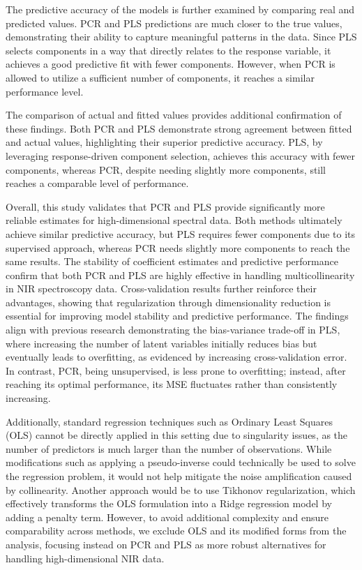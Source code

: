 \documentclass[11pt,twoside,a4paper]{article}
\begin{document}
The predictive accuracy of the models is further examined by comparing real and predicted values. PCR and PLS predictions are much closer to the true values, demonstrating their ability to capture meaningful patterns in the data. Since PLS selects components in a way that directly relates to the response variable, it achieves a good predictive fit with fewer components. However, when PCR is allowed to utilize a sufficient number of components, it reaches a similar performance level.

The comparison of actual and fitted values provides additional confirmation of these findings. Both PCR and PLS demonstrate strong agreement between fitted and actual values, highlighting their superior predictive accuracy. PLS, by leveraging response-driven component selection, achieves this accuracy with fewer components, whereas PCR, despite needing slightly more components, still reaches a comparable level of performance.

Overall, this study validates that PCR and PLS provide significantly more reliable estimates for high-dimensional spectral data. Both methods ultimately achieve similar predictive accuracy, but PLS requires fewer components due to its supervised approach, whereas PCR needs slightly more components to reach the same results. The stability of coefficient estimates and predictive performance confirm that both PCR and PLS are highly effective in handling multicollinearity in NIR spectroscopy data. Cross-validation results further reinforce their advantages, showing that regularization through dimensionality reduction is essential for improving model stability and predictive performance. The findings align with previous research demonstrating the bias-variance trade-off in PLS, where increasing the number of latent variables initially reduces bias but eventually leads to overfitting, as evidenced by increasing cross-validation error. In contrast, PCR, being unsupervised, is less prone to overfitting; instead, after reaching its optimal performance, its MSE fluctuates rather than consistently increasing.

Additionally, standard regression techniques such as Ordinary Least Squares (OLS) cannot be directly applied in this setting due to singularity issues, as the number of predictors is much larger than the number of observations. While modifications such as applying a pseudo-inverse could technically be used to solve the regression problem, it would not help mitigate the noise amplification caused by collinearity. Another approach would be to use Tikhonov regularization, which effectively transforms the OLS formulation into a Ridge regression model by adding a penalty term. However, to avoid additional complexity and ensure comparability across methods, we exclude OLS and its modified forms from the analysis, focusing instead on PCR and PLS as more robust alternatives for handling high-dimensional NIR data.
\newpage
\end{document}
